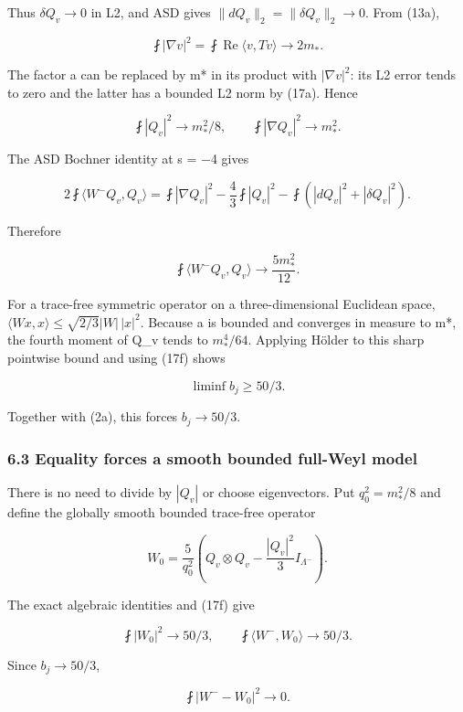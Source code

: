 Thus \(\delta Q_v\to0\) in L2, and ASD gives
\(\|dQ_v\|_2=\|\delta Q_v\|_2\to0\). From (13a),

\[
 \fint|\nabla v|^2=\fint\operatorname{Re}\langle v,Tv\rangle
 \longrightarrow2m_*.
\]

The factor a can be replaced by m* in its product with \(|\nabla v|^2\):
its L2 error tends to zero and the latter has a bounded L2 norm by
(17a). Hence

\[
 \fint|Q_v|^2\to m_*^2/8,\qquad
 \fint|\nabla Q_v|^2\to m_*^2.
\tag{17e}
\]

The ASD Bochner identity at s = −4 gives

\[
 2\fint\langle W^-Q_v,Q_v\rangle
 =\fint|\nabla Q_v|^2-\frac43\fint|Q_v|^2
 -\fint(|dQ_v|^2+|\delta Q_v|^2).
\]

Therefore

\[
 \boxed{\fint\langle W^-Q_v,Q_v\rangle\longrightarrow
                       \frac{5m_*^2}{12}.}
\tag{17f}
\]

For a trace-free symmetric operator on a three-dimensional Euclidean
space, \(\langle Wx,x\rangle\le\sqrt{2/3}|W|\,|x|^2\). Because a is
bounded and converges in measure to m*, the fourth moment of Q\_v tends
to \(m_*^4/64\). Applying Hölder to this sharp pointwise bound and using
(17f) shows

\[
 \liminf b_j\ge50/3.
\tag{17g}
\]

Together with (2a), this forces \(b_j\to50/3\).

\hypertarget{o10strength:equality-forces-a-smooth-bounded-full-weyl-model}{%
\subsubsection{6.3 Equality forces a smooth bounded full-Weyl
model}\label{o10strength:equality-forces-a-smooth-bounded-full-weyl-model}}

There is no need to divide by \(|Q_v|\) or choose eigenvectors. Put
\(q_0^2=m_*^2/8\) and define the globally smooth bounded trace-free
operator

\[
 W_0=\frac5{q_0^2}
       \left(Q_v\otimes Q_v-\frac{|Q_v|^2}{3}I_{\Lambda^-}\right).
\tag{17h}
\]

The exact algebraic identities and (17f) give

\[
 \fint|W_0|^2\longrightarrow50/3,
 \qquad\fint\langle W^-,W_0\rangle\longrightarrow50/3.
\]

Since \(b_j\to50/3\),

\[
 \boxed{\fint|W^--W_0|^2\longrightarrow0.}
\tag{17i}
\]


